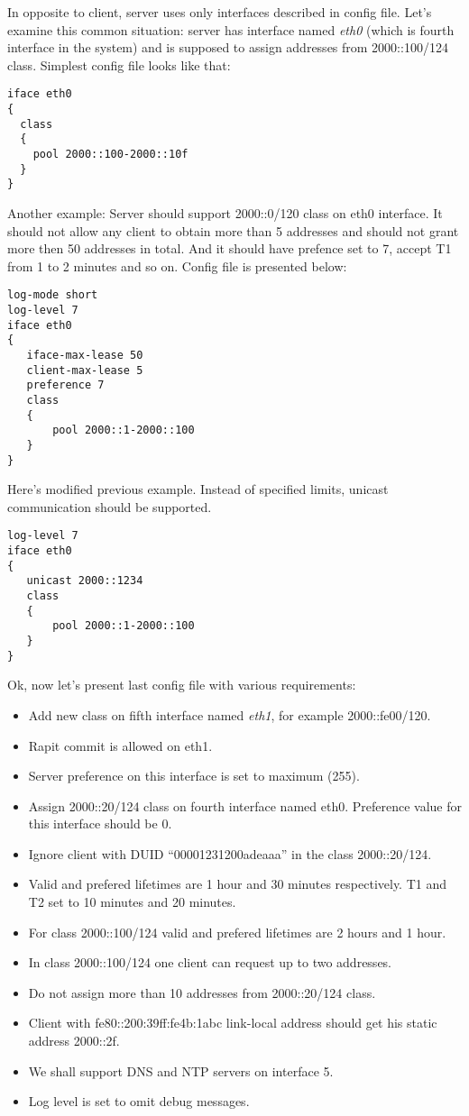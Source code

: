 In opposite to client, server uses only interfaces described in config
file. Let's examine this common situation: server has interface
named \emph{eth0} (which is fourth interface in the system) and is
supposed to assign addresses from 2000::100/124 class. Simplest config
file looks like that:

\begin{verbatim}
iface eth0
{ 
  class
  {
    pool 2000::100-2000::10f
  } 
}
\end{verbatim}

Another example: Server should support 2000::0/120 class on eth0
interface. It should not allow any client to obtain more than 5
addresses and should not grant more then 50 addresses in total. And it
should have prefence set to 7, accept T1 from 1 to 2 minutes and so
on. Config file is presented below:

\begin{verbatim}
log-mode short
log-level 7
iface eth0
{
   iface-max-lease 50
   client-max-lease 5
   preference 7
   class
   {
       pool 2000::1-2000::100
   }
}  
\end{verbatim}

Here's modified previous example. Instead of specified limits, unicast
communication should be supported.

\begin{verbatim}
log-level 7
iface eth0
{
   unicast 2000::1234
   class
   {
       pool 2000::1-2000::100
   }
}  
\end{verbatim}

Ok, now let's present last config file with various requirements:
\begin{itemize}
\item Add new class on fifth interface named \emph{eth1}, for example 2000::fe00/120.
\item Rapit commit is allowed on eth1.
\item Server preference on this interface is set to maximum (255).
\item Assign 2000::20/124 class on fourth interface named
  eth0. Preference value for this interface should be 0.
\item Ignore client with DUID ``00001231200adeaaa'' in the class
  2000::20/124.
\item Valid and prefered lifetimes are 1 hour and 30 minutes
  respectively. T1 and T2 set to 10 minutes and 20 minutes.
\item For class 2000::100/124 valid and prefered lifetimes are 2 hours
  and 1 hour.
\item In class 2000::100/124 one client can request up to two
  addresses.
\item Do not assign more than 10 addresses from 2000::20/124 class.
\item Client with fe80::200:39ff:fe4b:1abc link-local address should
  get his static address 2000::2f.
\item We shall support DNS and NTP servers on interface 5. 
\item Log level is set to omit debug messages.
\end{itemize}

